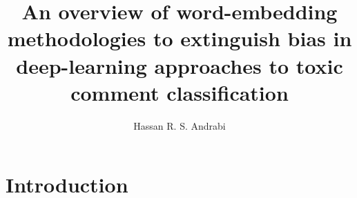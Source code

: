 \documentclass{article}
\title{An overview of word-embedding methodologies to extinguish bias in deep-learning approaches to toxic comment classification}
\author{Hassan R. S. Andrabi}
\date{}
\begin{document}
\maketitle

\begin{abstract}

\end{abstract}

\section{Introduction}\label{sec:introduction}

\end{document}
